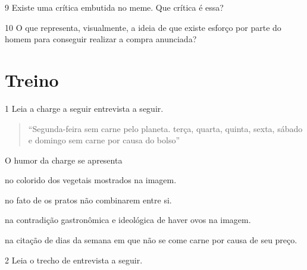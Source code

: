 
\num{9} Existe uma crítica embutida no meme. Que crítica é essa?


\num{10} O que representa, visualmente, a ideia de que existe esforço por parte
  do homem para conseguir realizar a compra anunciada?


\section{Treino}

\num{1} Leia a charge a seguir entrevista a seguir.


\begin{quote}
``Segunda-feira sem carne pelo planeta. terça, quarta, quinta, sexta,
sábado e domingo sem carne por causa do bolso''
\end{quote}

O humor da charge se apresenta

\begin{escolha}
\item no colorido dos vegetais mostrados na imagem.

\item no fato de os pratos não combinarem entre si.

\item na contradição gastronômica e ideológica de haver ovos na imagem.

\item na citação de dias da semana em que não se come carne por causa de
seu preço.
\end{escolha}


\num{2} Leia o trecho de entrevista a seguir.

